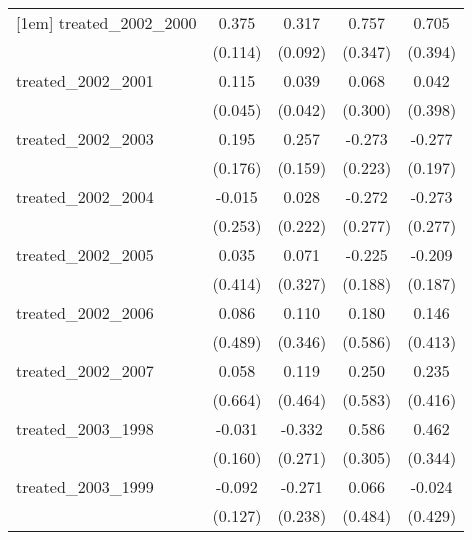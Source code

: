 {\begin{tabular}{l*{4}{c}}
[1em]
treated\_2002\_2000&       0.375\sym{**} &       0.317\sym{***}&       0.757\sym{*}  &       0.705         \\
            &     (0.114)         &     (0.092)         &     (0.347)         &     (0.394)         \\
[1em]
treated\_2002\_2001&       0.115\sym{*}  &       0.039         &       0.068         &       0.042         \\
            &     (0.045)         &     (0.042)         &     (0.300)         &     (0.398)         \\
[1em]
treated\_2002\_2003&       0.195         &       0.257         &      -0.273         &      -0.277         \\
            &     (0.176)         &     (0.159)         &     (0.223)         &     (0.197)         \\
[1em]
treated\_2002\_2004&      -0.015         &       0.028         &      -0.272         &      -0.273         \\
            &     (0.253)         &     (0.222)         &     (0.277)         &     (0.277)         \\
[1em]
treated\_2002\_2005&       0.035         &       0.071         &      -0.225         &      -0.209         \\
            &     (0.414)         &     (0.327)         &     (0.188)         &     (0.187)         \\
[1em]
treated\_2002\_2006&       0.086         &       0.110         &       0.180         &       0.146         \\
            &     (0.489)         &     (0.346)         &     (0.586)         &     (0.413)         \\
[1em]
treated\_2002\_2007&       0.058         &       0.119         &       0.250         &       0.235         \\
            &     (0.664)         &     (0.464)         &     (0.583)         &     (0.416)         \\
[1em]
treated\_2003\_1998&      -0.031         &      -0.332         &       0.586         &       0.462         \\
            &     (0.160)         &     (0.271)         &     (0.305)         &     (0.344)         \\
[1em]
treated\_2003\_1999&      -0.092         &      -0.271         &       0.066         &      -0.024         \\
            &     (0.127)         &     (0.238)         &     (0.484)         &     (0.429)         \\

\end{tabular}}
